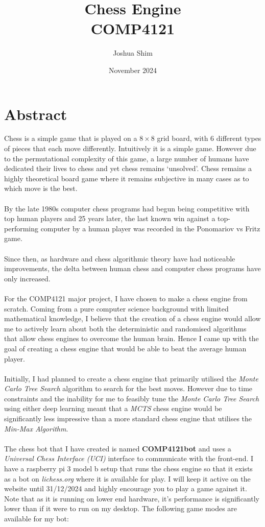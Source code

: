 \documentclass[twoside]{report}
\title{Chess Engine\\
{\Large COMP4121}}
\author{Joshua Shim}
\date{November 2024}
\begin{document}
\maketitle
\chapter*{Abstract}

Chess is a simple game that is played on a $8 \times 8$ grid board, with 6 different types of pieces that each move differently. Intuitively it is a simple game. However due to the permutational complexity of this game, a large number of humans have dedicated their lives to chess and yet chess remains `unsolved'. Chess remains a highly theoretical board game where it remains subjective in many cases as to which move is the best.
\\\\
By the late 1980s computer chess programs had begun being competitive with top human players and 25 years later, the last known win against a top-performing computer by a human player was recorded in the Ponomariov vs Fritz game.
\\\\
Since then, as hardware and chess algorithmic theory have had noticeable improvements, the delta between human chess and computer chess programs have only increased.
\\\\
For the COMP4121 major project, I have chosen to make a chess engine from scratch. Coming from a pure computer science background with limited mathematical knowledge, I believe that the creation of a chess engine would allow me to actively learn about both the deterministic and randomised algorithms that allow chess engines to overcome the human brain. Hence I came up with the goal of creating a chess engine that would be able to beat the average human player.
\\\\
Initially, I had planned to create a chess engine that primarily utilised the \textit{Monte Carlo Tree Search} algorithm to search for the best moves. However due to time constraints and the inability for me to feasibly tune the \textit{Monte Carlo Tree Search} using either deep learning meant that a \textit{MCTS} chess engine would be significantly less impressive than a more standard chess engine that utilises the \textit{Min-Max Algorithm}.
\\\\
The chess bot that I have created is named \textbf{COMP4121bot} and uses a \textit{Universal Chess Interface (UCI)} interface to communicate with the front-end. I have a raspberry pi 3 model b setup that runs the chess engine so that it exists as a bot on \textit{lichess.org} where it is available for play. I will keep it active on the website until 31/12/2024 and highly encourage you to play a game against it. Note that as it is running on lower end hardware, it's performance is significantly lower than if it were to run on my desktop. The following game modes are available for my bot:

\tableofcontents







\end{document}
